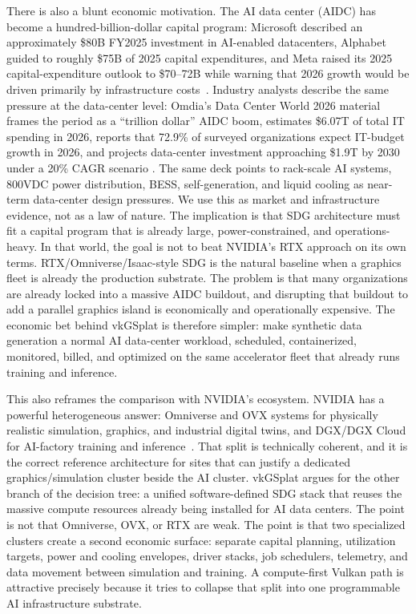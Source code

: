 \documentclass[10pt,journal,onecolumn]{IEEEtran}
\begin{document}
There is also a blunt economic motivation. The AI data center (AIDC) has become
a hundred-billion-dollar capital program: Microsoft described an approximately
\$80B FY2025 investment in AI-enabled datacenters, Alphabet guided to roughly
\$75B of 2025 capital expenditures, and Meta raised its 2025 capital-expenditure
outlook to \$70--72B while warning that 2026 growth would be driven primarily by
infrastructure costs~\cite{microsoft-ai-datacenter-2025,alphabet-q4-2024-capex,meta-q3-2025-capex}.
Industry analysts describe the same pressure at the data-center level: Omdia's
Data Center World 2026 material frames the period as a ``trillion dollar''
AIDC boom, estimates \$6.07T of total IT spending in 2026, reports that
72.9\% of surveyed organizations expect IT-budget growth in 2026, and projects
data-center investment approaching \$1.9T by 2030 under a 20\% CAGR scenario
\cite{omdia-dcw-oas-2026}. The same deck points to rack-scale AI systems,
800VDC power distribution, BESS, self-generation, and liquid cooling as
near-term data-center design pressures. We use this as market and infrastructure
evidence, not as a law of nature. The implication is that SDG architecture must
fit a capital program that is already large, power-constrained, and
operations-heavy.
In that world, the goal is not to beat NVIDIA's RTX approach on its own terms.
RTX/Omniverse/Isaac-style SDG is the natural baseline when a graphics fleet is
already the production substrate. The problem is that many organizations are
already locked into a massive AIDC buildout, and disrupting that buildout to add
a parallel graphics island is economically and operationally expensive. The
economic bet behind vkGSplat is therefore simpler: make synthetic data
generation a normal AI data-center workload, scheduled, containerized,
monitored, billed, and optimized on the same accelerator fleet that already runs
training and inference.

This also reframes the comparison with NVIDIA's ecosystem. NVIDIA has a
powerful heterogeneous answer: Omniverse and OVX systems for physically
realistic simulation, graphics, and industrial digital twins, and DGX/DGX Cloud
for AI-factory training and inference~\cite{nvidia-ovx,nvidia-dgx-cloud}. That
split is technically coherent, and it is the correct reference architecture for
sites that can justify a dedicated graphics/simulation cluster beside the AI
cluster. vkGSplat argues for the other branch of the decision tree: a unified
software-defined SDG stack that reuses the massive compute resources already
being installed for AI data centers. The point is not that Omniverse, OVX, or
RTX are weak. The point is that two specialized clusters create a second
economic surface: separate capital planning, utilization targets, power and
cooling envelopes, driver stacks, job schedulers, telemetry, and data movement
between simulation and training. A compute-first Vulkan path is attractive
precisely because it tries to collapse that split into one programmable AI
infrastructure substrate.
\end{document}
